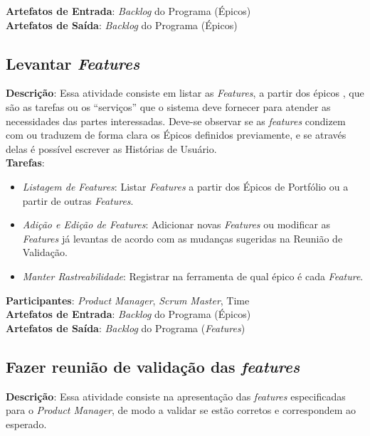  \textbf{Artefatos de Entrada}: \textit{Backlog} do Programa (Épicos) \\

  \textbf{Artefatos de Saída}:  \textit{Backlog} do Programa (Épicos) \\

\subsection{Levantar \textit{Features}}
\textbf{Descrição}: Essa atividade consiste em listar as \textit{Features}, a partir dos épicos ,
que são as tarefas ou os “serviços” que o sistema deve fornecer para atender as necessidades das partes interessadas.
Deve-se observar se as \textit{features} condizem com ou traduzem de forma clara os Épicos
definidos previamente, e se através delas é possível escrever as Histórias de Usuário.\\

\textbf{Tarefas}:

  \begin{itemize}
   \item \indent \textit{Listagem de \textit{Features}}:  Listar \textit{Features} a partir dos Épicos de Portfólio ou a partir de outras \textit{Features}.

   \item \indent \textit{Adição e Edição de \textit{Features}}: Adicionar novas \textit{Features} ou modificar as \textit{Features} já levantas de acordo com as mudanças sugeridas na Reunião de Validação.

   \item \indent \textit{Manter Rastreabilidade}: Registrar na ferramenta de qual épico é cada \textit{Feature}.
   \end{itemize}

\textbf{Participantes}: \textit{Product Manager}, \textit{Scrum Master}, Time \\

\textbf{Artefatos de Entrada}: \textit{Backlog} do Programa (Épicos) \\

\textbf{Artefatos de Saída}:   \textit{Backlog} do Programa (\textit{Features}) \\

\subsection{Fazer reunião de validação das \textit{features}}
  \textbf{Descrição}: Essa atividade consiste na apresentação das \textit{features} especificadas para o \textit{Product Manager}, de modo a validar se
  estão corretos e correspondem ao esperado.  \\

